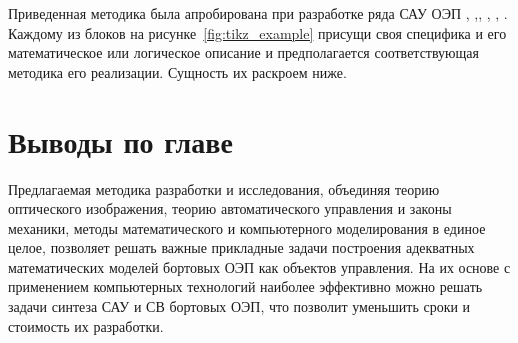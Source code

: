 Приведенная методика была апробирована при разработке ряда САУ ОЭП \cite[]{Belyakov}, \cite[]{Torshina},\cite[]{Malivanov-a2-9}, \cite[]{Burdinov-a2-10}, \cite[]{Sokolski22}, \cite[]{Dubovik-a2-12}. Каждому из блоков на рисунке~\ref{fig:tikz_example} присущи своя специфика и его математическое или логическое описание и предполагается соответствующая методика его реализации. Сущность их раскроем ниже.
 

\section{Выводы по главе} \label{sec:ch2/sec9}

Предлагаемая методика разработки и исследования, объединяя теорию оптического изображения, теорию автоматического управления и законы механики, методы математического и компьютерного моделирования в единое целое, позволяет решать важные прикладные задачи построения адекватных математических моделей бортовых ОЭП как объектов управления. На их основе с применением компьютерных технологий наиболее эффективно можно решать задачи синтеза САУ и СВ бортовых ОЭП, что позволит уменьшить сроки и стоимость их разработки. 

\clearpage